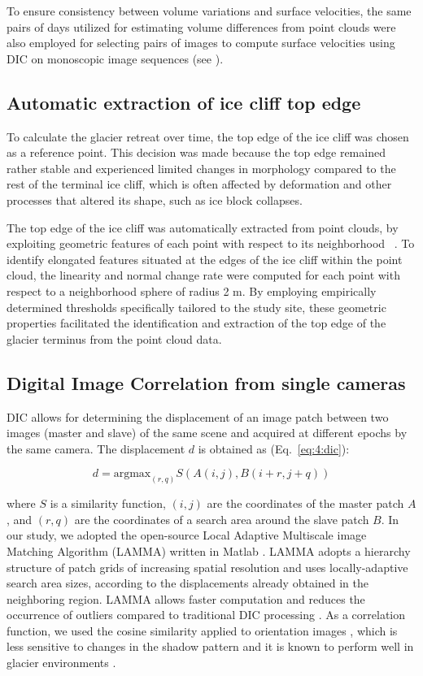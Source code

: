 To ensure consistency between volume variations and surface velocities, the same pairs of
days utilized for estimating volume differences from point clouds were also employed for
selecting pairs of images to compute surface velocities using DIC on monoscopic image
sequences (see ).

\subsection{Automatic extraction of ice cliff top edge}
\label{sec:4:topedge}
To calculate the glacier retreat over time, the top edge of the ice cliff was chosen as a
reference point.
This decision was made because the top edge remained rather stable and experienced
limited changes in morphology compared to the rest of the terminal ice cliff, which is
often affected by deformation and other processes that altered its shape, such as ice
block collapses.

The top edge of the ice cliff was automatically extracted from point clouds, by
exploiting geometric features of each point with respect to its neighborhood
~\citep{Hackel2016}.
To identify elongated features situated at the edges of the ice cliff within the point
cloud, the linearity and normal change rate were computed for each point with respect to
a neighborhood sphere of radius 2 m. By employing empirically determined thresholds
specifically tailored to the study site, these geometric properties facilitated the
identification and extraction of the top edge of the glacier terminus from the point
cloud data.

\subsection{Digital Image Correlation from single cameras}
\label{sec:4:dic}
DIC allows for determining the displacement of an image patch between two images (master
and slave) of the same scene and acquired at different epochs by the same camera. The
displacement \(d\) is obtained as  (Eq.~\ref{eq:4:dic}):

\begin{equation}
  d = \text{argmax}_{(r,q)} S(A(i,j),B(i+r,j+q))
  \label{eq:4:dic}
\end{equation}

where \(S\) is a similarity function, \((i,j)\) are the coordinates of the master patch
\(A\), and \((r,q)\) are the coordinates of a search area around the slave patch \(B\).
In our study, we adopted the open-source Local Adaptive Multiscale image Matching
Algorithm (LAMMA) written in Matlab \citep{Dematteis2022}.
LAMMA adopts a hierarchy structure of patch grids of increasing spatial resolution and
uses locally-adaptive search area sizes, according to the displacements already
obtained in the neighboring region.
LAMMA allows faster computation and reduces the occurrence of outliers compared to
traditional DIC processing \citep{Dematteis2022}. As a correlation function, we used the
cosine similarity applied to orientation images \citep{Dematteis2021}, which is less
sensitive to changes in the shadow pattern and it is known to perform well in glacier
environments \citep{Heid2012_evaluation_xcorr}.

